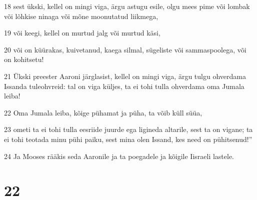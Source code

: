 \par 18 sest ükski, kellel on mingi viga, ärgu astugu esile, olgu mees pime või lombak või lõhkise ninaga või mõne moonutatud liikmega,
\par 19 või keegi, kellel on murtud jalg või murtud käsi,
\par 20 või on küürakas, kuivetanud, kaega silmal, sügeliste või sammaspoolega, või on kohitsetu!
\par 21 Ükski preester Aaroni järglasist, kellel on mingi viga, ärgu tulgu ohverdama Issanda tuleohvreid: tal on viga küljes, ta ei tohi tulla ohverdama oma Jumala leiba!
\par 22 Oma Jumala leiba, kõige pühamat ja püha, ta võib küll süüa,
\par 23 ometi ta ei tohi tulla eesriide juurde ega ligineda altarile, sest ta on vigane; ta ei tohi teotada minu pühi paiku, sest mina olen Issand, kes need on pühitsenud!”
\par 24 Ja Mooses rääkis seda Aaronile ja ta poegadele ja kõigile Iisraeli lastele.

\chapter{22}

